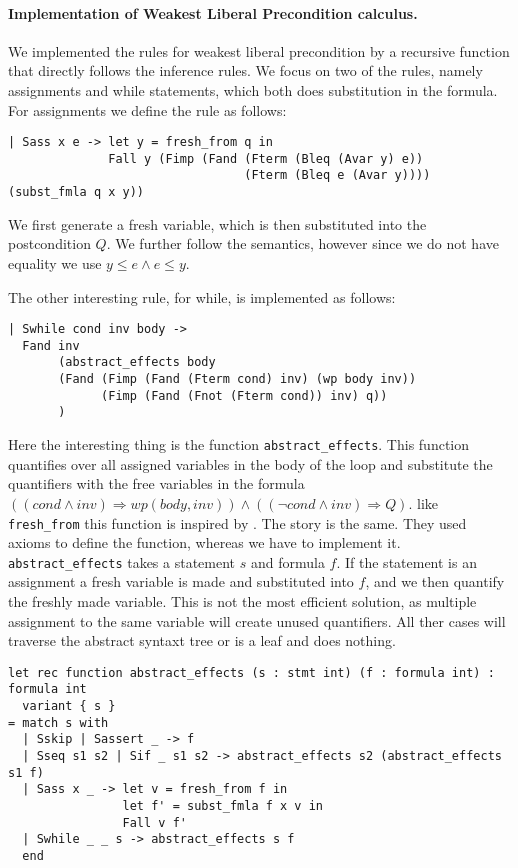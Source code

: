 \paragraph{Implementation of Weakest Liberal Precondition calculus.}
We implemented the rules for weakest liberal precondition by a recursive function that directly
follows the inference rules.
We focus on two of the rules, namely assignments and while statements, which both does substitution in the formula.
For assignments we define the rule as follows:

\begin{lstlisting}
| Sass x e -> let y = fresh_from q in
              Fall y (Fimp (Fand (Fterm (Bleq (Avar y) e))
                                 (Fterm (Bleq e (Avar y)))) (subst_fmla q x y))
\end{lstlisting}

We first generate a fresh variable, which is then substituted into the postcondition $Q$.
We further follow the semantics, however since we do not have equality we use $y \leq e \wedge e \leq y$.

The other interesting rule, for while, is implemented as follows:
\begin{lstlisting}
| Swhile cond inv body ->
  Fand inv
       (abstract_effects body
       (Fand (Fimp (Fand (Fterm cond) inv) (wp body inv))
             (Fimp (Fand (Fnot (Fterm cond)) inv) q))
       )
\end{lstlisting}

Here the interesting thing is the function \texttt{abstract\_effects}. This function quantifies over all assigned variables in the body of the loop and substitute the quantifiers with the free variables in the formula
$((cond \wedge inv) \Rightarrow wp(body,inv)) \wedge ((\neg cond \wedge inv) \Rightarrow Q)$. like \texttt{fresh\_from} this function is inspired by \cite{TODO}. The story is the same. They used axioms to define the function, whereas we have to implement it.
\texttt{abstract\_effects} takes a statement $s$ and formula $f$.
If the statement is an assignment
a fresh variable is made and substituted into $f$, and we then quantify the freshly made variable.
This is not the most efficient solution, as multiple assignment to the same variable will create unused quantifiers.
All ther cases will traverse the abstract syntaxt tree or is a leaf and does nothing.

\begin{lstlisting}
let rec function abstract_effects (s : stmt int) (f : formula int) : formula int
  variant { s }
= match s with
  | Sskip | Sassert _ -> f
  | Sseq s1 s2 | Sif _ s1 s2 -> abstract_effects s2 (abstract_effects s1 f)
  | Sass x _ -> let v = fresh_from f in
                let f' = subst_fmla f x v in
                Fall v f'
  | Swhile _ _ s -> abstract_effects s f
  end
\end{lstlisting}

